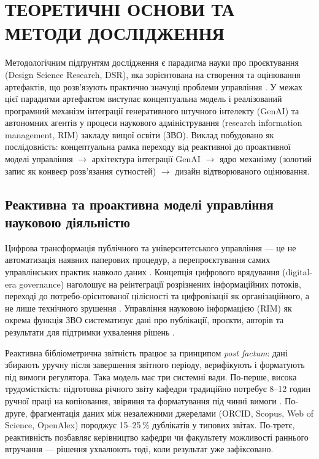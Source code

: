 \section*{ТЕОРЕТИЧНІ ОСНОВИ ТА МЕТОДИ ДОСЛІДЖЕННЯ}

Методологічним підґрунтям дослідження є парадигма науки про проєктування (Design Science Research, DSR), яка зорієнтована на створення та оцінювання артефактів, що розв'язують практично значущі проблеми управління \cite{Hevner2004DSR,Peffers2007DSRMeth}. У межах цієї парадигми артефактом виступає концептуальна модель і реалізований програмний механізм інтеграції генеративного штучного інтелекту (GenAI) та автономних агентів у процеси наукового адміністрування (research information management, RIM) закладу вищої освіти (ЗВО). Виклад побудовано як послідовність: концептуальна рамка переходу від реактивної до проактивної моделі управління $\rightarrow$ архітектура інтеграції GenAI $\rightarrow$ ядро механізму (золотий запис як конвеєр розв'язання сутностей) $\rightarrow$ дизайн відтворюваного оцінювання.

\subsection*{Реактивна та проактивна моделі управління науковою діяльністю}

Цифрова трансформація публічного та університетського управління — це не автоматизація наявних паперових процедур, а перепроєктування самих управлінських практик навколо даних \cite{Mergel2019DefiningDigitalTransformation}. Концепція цифрового врядування (digital-era governance) наголошує на реінтеграції розрізнених інформаційних потоків, переході до потребо-орієнтованої цілісності та цифровізації як організаційного, а не лише технічного зрушення \cite{Dunleavy2006DigitalEraGovernance}. Управління науковою інформацією (RIM) як окрема функція ЗВО систематизує дані про публікації, проєкти, авторів та результати для підтримки ухвалення рішень \cite{Bryant2017RIMDefining}.

Реактивна бібліометрична звітність працює за принципом \emph{post factum}: дані збирають уручну після завершення звітного періоду, верифікують і форматують під вимоги регулятора. Така модель має три системні вади. По-перше, висока трудомісткість: підготовка річного звіту кафедри традиційно потребує 8--12 годин ручної праці на копіювання, звіряння та форматування під чинні вимоги \cite{MONUkraine2023ProfessionalJournalsOrder}. По-друге, фрагментація даних між незалежними джерелами (ORCID, Scopus, Web of Science, OpenAlex) породжує 15--25\,\% дублікатів у типових звітах. По-третє, реактивність позбавляє керівництво кафедри чи факультету можливості раннього втручання — рішення ухвалюють тоді, коли результат уже зафіксовано.


